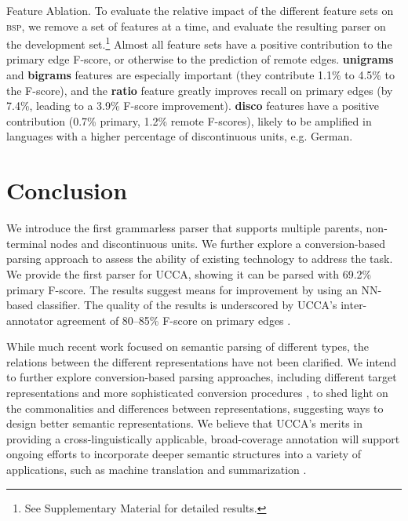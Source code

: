 \documentclass[11pt,letterpaper]{article}
\makeatletter
\renewcommand{\paragraph}{
  \@startsection{paragraph}{4}
  {\z@}{.3ex \@plus .3ex \@minus .2ex}{-1em}
  {\normalfont\normalsize\bfseries}
}
\makeatother
\begin{document}
\paragraph{Feature Ablation.}
To evaluate the relative impact of the different feature sets on \textsc{bsp},
we remove a set of features at a time,
and evaluate the resulting parser on the development set.\footnote{See
Supplementary Material for detailed results.}
Almost all feature sets have a positive contribution to the primary edge F-score, 
or otherwise to the prediction of remote edges.
\textbf{unigrams} and \textbf{bigrams} features are especially
important (they contribute 1.1\% to 4.5\% to the F-score),
and the \textbf{ratio} feature greatly improves recall on
primary edges (by 7.4\%, leading to  a 3.9\% F-score improvement).
\textbf{disco} features have a positive contribution
(0.7\% primary, 1.2\% remote F-scores),
likely to be amplified in languages with a higher percentage of discontinuous units, e.g. German.



\section{Conclusion}\label{sec:conclusion}

We introduce the first grammarless parser that supports multiple parents, non-terminal
nodes and discontinuous units.
We further explore a conversion-based parsing approach to assess the ability of existing
technology to address the task.
We provide the first parser for UCCA, showing it can be parsed with 69.2\% primary F-score.
The results suggest means for improvement by using an NN-based classifier.
The quality of the results is underscored by UCCA's inter-annotator
agreement of 
80--85\% F-score on primary edges \cite{abend2013universal}.

While much recent work focused on semantic parsing of different types,
the relations between the different representations have not been clarified.
We intend to further explore conversion-based parsing approaches,
including different target representations and more sophisticated conversion procedures \cite{kong-15},
to shed light on the commonalities and differences between representations, suggesting ways to
design better semantic representations.
We believe that UCCA's merits in providing a cross-linguistically applicable, broad-coverage
annotation will support ongoing efforts to incorporate deeper semantic structures
into a variety of applications, such as machine translation \cite{jones2012semantics}
and summarization \cite{liu2015toward}.




\end{document}
